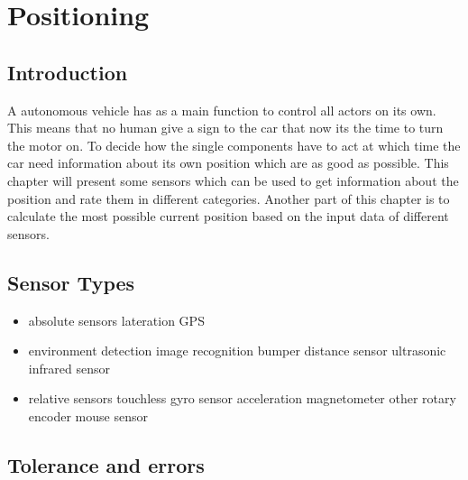 \documentclass[11pt]{report}
\begin{document}



\tableofcontents



\chapter{Positioning}\label{chap:positioning}
\section{Introduction}\label{sec:introduction}
A autonomous vehicle has as a main function to control all actors on its own.
This means that no human give a sign to the car that now its the time to turn the motor on.
To decide how the single components have to act at which time 
the car need information about its own position which are as good as possible.
This chapter will present some sensors which can be used to get information about the position and rate them in different categories.
Another part of this chapter is to calculate the most possible current position based on the input data of different sensors.

\section{Sensor Types}
\begin{itemize}
\item absolute sensors
	\subitem lateration
		\subsubitem GPS	
\item environment detection
	\subitem image recognition
	\subitem bumper
	\subitem distance sensor
		\subsubitem ultrasonic
		\subsubitem infrared sensor
\item relative sensors
	\subitem touchless
		\subsubitem gyro sensor
		\subsubitem acceleration
		\subsubitem magnetometer
	\subitem other
		\subsubitem rotary encoder
		\subsubitem mouse sensor
\end{itemize}

\section{Tolerance and errors}




{}

\end{document}
